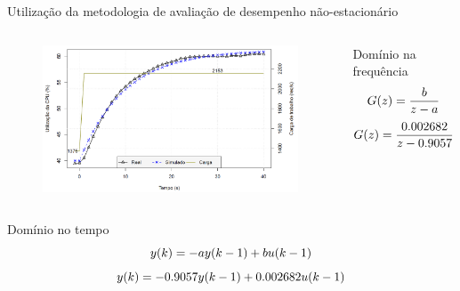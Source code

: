 \begin{frame}{Utilização da metodologia de avaliação de desempenho não-estacionário}
	\begin{columns}
		\begin{figure}[htb]
			\centering
			\includegraphics[scale=0.25]{images/resultado_edwin_identificao_sys.png}				
		\end{figure}
		\begin{block}{Domínio na frequência}
			\begin{equation}
				\small
				G(z) = \frac{b}{z - a}
			\end{equation}			
			\begin{equation}
				\small
				G(z) = \frac{0.002682}{z - 0.9057}
			\end{equation}							
		\end{block}
		\caption{Resultados trabalho \cite{Edwin2015}}				
				
	\end{columns}
	\begin{block}{Domínio no tempo}
		\begin{equation}
			\small	
			y(k) = -ay(k-1) + bu(k-1)
		\end{equation}			
		\begin{equation}
			\small
			y(k) = -0.9057y(k-1) + 0.002682u(k-1)
		\end{equation}
	\end{block}

\end{frame}





